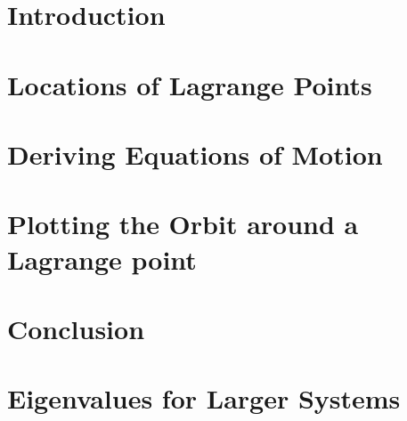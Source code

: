 \documentclass[12pt]{article}
\begin{document}
	
	
	{\singlespacing \tableofcontents}
	
	\newpage
	
	\section{Introduction}
	
	
	
	\section{Locations of Lagrange Points}
	
	
	
	\section{Deriving Equations of Motion}
	
	
	
	\section{Plotting the Orbit around a Lagrange point}
	
	
	
	\section{Conclusion}
	
	\newpage
	
	\printbibliography[
	heading=bibintoc,
	title={Bibliography}
	]
	
	\newpage
	
	\appendix
	
	\section{Eigenvalues for Larger Systems} \label{app:eigen}
	
	
	
\end{document}
